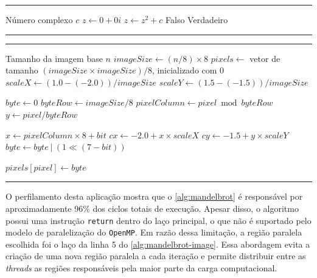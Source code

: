 \begin{sourcecode}[htb]
    \caption{Cálculo do conjunto de Mandelbrot.}
    \label{alg:mandelbrot}
    \hrule
    \begin{algorithmic}[1]
        \REQUIRE Número complexo $c$
        \STATE $z \gets 0 + 0i$
        \STATE $z \gets z^2 + c$
        \RETURN Falso
        \ENDIF
        \ENDFOR
        \RETURN Verdadeiro
    \end{algorithmic}
    \hrule
\end{sourcecode}

\begin{sourcecode}[htb]
    \caption{Geração da imagem do conjunto de Mandelbrot.}
    \label{alg:mandelbrot-image}
    \hrule
    \begin{algorithmic}[1]
        \REQUIRE Tamanho da imagem base $n$
        \STATE $imageSize \gets (n / 8) \times 8$
        \STATE $pixels \gets$ vetor de tamanho $(imageSize \times imageSize) / 8$, inicializado com $0$
        \STATE $scaleX \gets (1.0 - (-2.0)) / imageSize$
        \STATE $scaleY \gets (1.5 - (-1.5)) / imageSize$

        \STATE $byte \gets 0$
        \STATE $byteRow \gets imageSize / 8$
        \STATE $pixelColumn \gets pixel \bmod byteRow$
        \STATE $y \gets pixel / byteRow$

        \STATE $x \gets pixelColumn \times 8 + bit$
        \STATE $cx \gets -2.0 + x \times scaleX$
        \STATE $cy \gets -1.5 + y \times scaleY$
        \STATE $byte \gets byte\ |\ (1 \ll (7 - bit))$
        \ENDIF
        \ENDFOR

        \STATE $pixels[pixel] \gets byte$
        \ENDFOR
    \end{algorithmic}
    \hrule
\end{sourcecode}

O perfilamento desta aplicação mostra que o \autoref{alg:mandelbrot} é responsável por aproximadamente 96\% dos ciclos totais de execução. Apesar disso, o algoritmo possui uma instrução \texttt{return} dentro do laço principal, o que não é suportado pelo modelo de paralelização do \texttt{OpenMP}. Em razão dessa limitação, a região paralela escolhida foi o laço da linha 5 do \autoref{alg:mandelbrot-image}. Essa abordagem evita a criação de uma nova região paralela a cada iteração e permite distribuir entre as \textit{threads} as regiões responsáveis pela maior parte da carga computacional.

